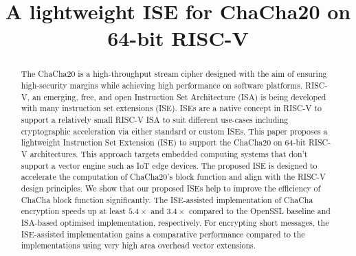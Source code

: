 \documentclass[sigconf]{acmart}
\begin{document}

\title{A lightweight ISE for ChaCha20 on 64-bit RISC-V}
%

%

\begin{abstract}
The ChaCha20 is a high-throughput stream cipher designed with the aim of ensuring high-security margins while achieving high performance on software platforms. RISC-V, an emerging, free, and open Instruction Set Architecture (ISA) is being developed with many instruction set extensions (ISE). ISEs are a native concept in RISC-V to support a relatively small RISC-V ISA to suit different use-cases including cryptographic acceleration via either standard or custom ISEs. This paper proposes a lightweight Instruction Set Extension (ISE) to support the ChaCha20 on 64-bit RISC-V architectures. This approach targets embedded computing systems that don't support a vector engine such as IoT edge devices. The proposed ISE is designed to accelerate the computation of ChaCha20's block function and align with the  RISC-V design principles. We show that our proposed ISEs help to improve the efficiency of ChaCha block function significantly. 
The ISE-assisted implementation of ChaCha encryption speeds up at least $5.4\times$ and $3.4\times$ compared to the OpenSSL baseline and ISA-based optimised implementation, respectively. 
For encrypting short messages, the ISE-assisted implementation gains a comparative performance compared to the implementations using very high area overhead vector extensions.
\end{abstract}
\end{document}
